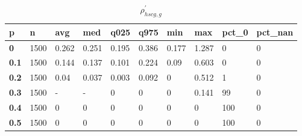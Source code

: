 \begin{table}[h]
 \centering 
\footnotesize
\caption{$\rho_{hscg,g}^\prime $}
\label{tab:alphahscgg}
\begin{tabular}[h]{|l|l|l|l|l|l|l|l|l|l|
    } \hline
\textbf{ p} & \textbf{ n} & \textbf{ avg} & \textbf{ med} & \textbf{ q025} & \textbf{ q975} & \textbf{ min} & \textbf{ max} & \textbf{ pct\_0} & \textbf{ pct\_nan}
    \\ \hline
  \textbf{  0} & 1500 & 0.262 & 0.251 & 0.195 & 0.386 & 0.177 & 1.287 &   0 & 0
    \\ \hline
  \textbf{0.1} & 1500 & 0.144 & 0.137 & 0.101 & 0.224 &  0.09 & 0.603 &   0 & 0
    \\ \hline
  \textbf{0.2} & 1500 &  0.04 & 0.037 & 0.003 & 0.092 &     0 & 0.512 &   1 & 0
    \\ \hline
  \textbf{0.3} & 1500 & - & - &     0 &     0 &     0 & 0.141 &  99 & 0
    \\ \hline
  \textbf{0.4} & 1500 &     0 &     0 &     0 &     0 &     0 &     0 & 100 & 0
    \\ \hline
  \textbf{0.5} & 1500 &     0 &     0 &     0 &     0 &     0 &     0 & 100 & 0
    \\ \hline
 \end{tabular}
 \end{table}
